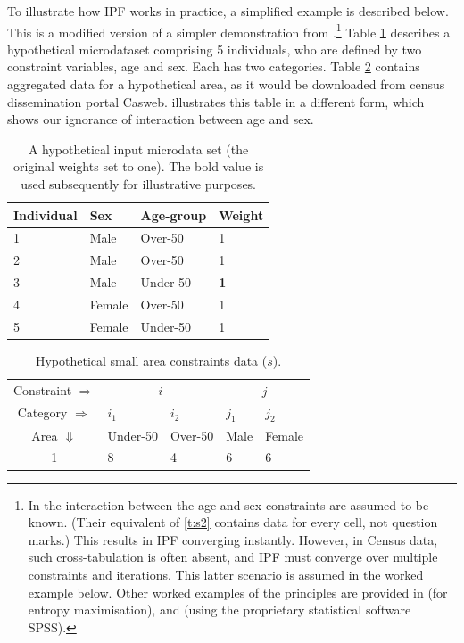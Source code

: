 \documentclass[a4paper, 11pt, twoside]{Thesis}
\begin{document}
To illustrate how IPF works in practice, a simplified example is described below.
This is a modified version of a simpler demonstration from
\citet{Ballas2005}.\footnote{In \citet{Ballas2005}
the interaction between the age and sex constraints are assumed to be known.
(Their equivalent of \cref{t:s2} contains data for every cell,
not question marks.) This results in IPF converging instantly.
However, in Census data, such cross-tabulation is
often absent, and IPF must converge over multiple constraints and
iterations. This latter scenario is assumed in the worked example below. Other
worked examples of the principles are provided in \citet[Appendix
3]{johnston1985geography} (for entropy maximisation), \citet{Norman1999a} and
\citet{Simpson2005} (using the proprietary statistical software SPSS).
}
Table \ref{t:w}  describes a
hypothetical microdataset comprising 5 individuals, who are defined by two
constraint variables, age and sex. Each has two categories.
Table \ref{t:s} contains aggregated data
for a hypothetical area, as it would be downloaded from census dissemination
portal Casweb.  illustrates this table in a different form,
which shows our ignorance of interaction between age and sex.


\begin{table}[h]
\centering
\caption[A hypothetical input microdata set]{A
hypothetical input microdata set (the original
weights set to one). The bold value is used subsequently for
illustrative purposes.}
\begin{tabular}{llll}
\toprule
{Individual } & {Sex} & {Age-group} & {Weight} \\
\midrule
1 & Male & Over-50 & 1 \\
2 & Male & Over-50 & 1 \\
3 & {Male} & {Under-50} & \textbf{1} \\
4 & Female & Over-50 & 1 \\
5 & Female & Under-50 & 1 \\
\bottomrule
\end{tabular}
\label{t:w}
\end{table}
\vspace{1cm}


\begin{table}[htbp]
\centering
\caption{Hypothetical small area constraints data ($s$).}
\begin{tabular}{cllll}
\toprule
Constraint $\Rightarrow$ & \multicolumn{2}{c}{$i$}& \multicolumn{2}{c}{$j$}\\
Category $\Rightarrow$ & $i_1$ & $i_2$ & $j_1$ & $j_2$ \\
Area $\Downarrow$  & Under-50 & Over-50 &  Male & Female\\
1  & 8 & 4 & 6 & 6\\
\bottomrule
\end{tabular}
\label{t:s}
\end{table}
\vspace{1cm}
\end{document}
